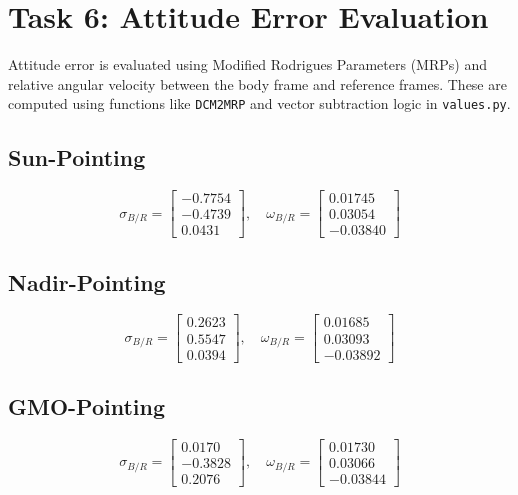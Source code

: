 \documentclass[conf]{new-aiaa}
\begin{document}
\section{Task 6: Attitude Error Evaluation}
Attitude error is evaluated using Modified Rodrigues Parameters (MRPs) and relative angular velocity between the body frame and reference frames. These are computed using functions like \texttt{DCM2MRP} and vector subtraction logic in \texttt{values.py}.

\subsection*{Sun-Pointing}
\[
\sigma_{B/R} =
\begin{bmatrix}
-0.7754 \\ -0.4739 \\ 0.0431
\end{bmatrix}, \quad
\omega_{B/R} =
\begin{bmatrix}
0.01745 \\ 0.03054 \\ -0.03840
\end{bmatrix}
\]

\subsection*{Nadir-Pointing}
\[
\sigma_{B/R} =
\begin{bmatrix}
0.2623 \\ 0.5547 \\ 0.0394
\end{bmatrix}, \quad
\omega_{B/R} =
\begin{bmatrix}
0.01685 \\ 0.03093 \\ -0.03892
\end{bmatrix}
\]

\subsection*{GMO-Pointing}
\[
\sigma_{B/R} =
\begin{bmatrix}
0.0170 \\ -0.3828 \\ 0.2076
\end{bmatrix}, \quad
\omega_{B/R} =
\begin{bmatrix}
0.01730 \\ 0.03066 \\ -0.03844
\end{bmatrix}
\]
\end{document}
